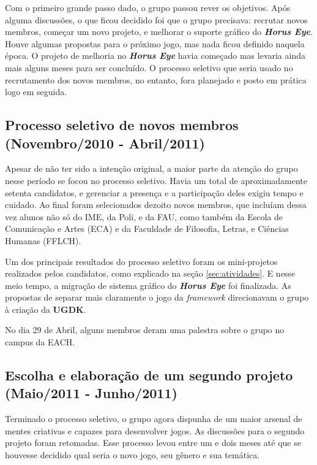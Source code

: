 \documentclass[12pt,onecolumn,a4paper]{article}
\begin{document}
        Com o primeiro grande passo dado, o grupo passou rever os objetivos. Após alguma discussões,
        o que ficou decidido foi que o grupo precisava: recrutar novos membros, começar um novo
        projeto, e melhorar o suporte gráfico do \textit{\textbf{Horus Eye}}. Houve algumas
        propostas para o próximo jogo, mas nada ficou definido naquela época. O projeto de melhoria
        no \textit{\textbf{Horus Eye}} havia começado mas levaria ainda mais alguns meses para ser
        concluído. O processo seletivo que seria usado no recrutamento dos novos membros, no
        entanto, fora planejado e posto em prática logo em seguida.

    \subsection{Processo seletivo de novos membros \\
                {\small(Novembro/2010 - Abril/2011)} }
        Apesar de não ter sido a intenção original, a maior parte da atenção do grupo nesse período
        se focou no processo seletivo. Havia um total de aproximadamente setenta candidatos, e
        gerenciar a presença e a participação deles exigiu tempo e cuidado. Ao final foram
        selecionados dezoito novos membros, que incluíam dessa vez alunos não só do IME, da Poli, e
        da FAU, como também da Escola de Comunicação e Artes (ECA) e da Faculdade de Filosofia,
        Letras, e Ciências Humanas (FFLCH).
        
        Um dos principais resultados do processo seletivo foram os mini-projetos realizados pelos
        candidatos, como explicado na seção \ref{sec:atividades}. E nesse meio tempo, a migração de
        sistema gráfico do \textit{\textbf{Horus Eye}} foi finalizada. As propostas de separar mais
        claramente o jogo da \textit{framework} direcionavam o grupo à criação da \textbf{UGDK}.
        
        No dia 29 de Abril, alguns membros deram uma palestra sobre o grupo no campus da EACH.

    \subsection{Escolha e elaboração de um segundo projeto \\
                {\small(Maio/2011 - Junho/2011)} }
        Terminado o processo seletivo, o grupo agora dispunha de um maior arsenal de mentes
        criativas e capazes para desenvolver jogos. As discussões para o segundo projeto foram
        retomadas. Esse processo levou entre um e dois meses até que se houvesse decidido qual seria
        o novo jogo, seu gênero e sua temática.
        
\end{document}
